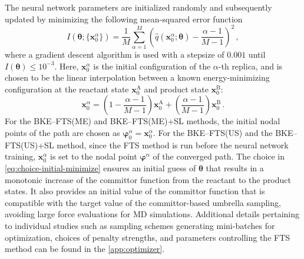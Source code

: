 \documentclass{article}
\numberwithin{equation}{section}
\def\*#1{\mathbf{#1}}
\theoremstyle{definition}
\theoremstyle{remark}
\def\thetab{\boldsymbol{\theta}}
\def\varphib{\boldsymbol{\varphi}}
\begin{document}
The neural network parameters are initialized randomly and subsequently updated by minimizing the following mean-squared error function
\begin{equation}
    I(\thetab; \{ \* x_0^\alpha \} ) = \frac{1}{M} \sum_{\alpha =1}^M \left(\hat{q}(\* x_0^\alpha; \thetab)-\frac{\alpha-1}{M-1} \right)^2 \,, \label{eq:choice-initial-minimize}
\end{equation}
where a gradient descent algorithm is used with a stepsize of $ 0.001 $ until $ I (\thetab) \leq 10^{-3} $. Here, $\* x_0^\alpha$ is the initial configuration of the $\alpha$-th replica, and  
is chosen to be the linear interpolation between a known energy-minimizing configuration at the reactant state $\* x_{0}^\mathrm{A}$ and product state $\* x_{0}^\mathrm{B} $:
\begin{equation}
    \* x_0^\alpha = \left( 1 - \frac{\alpha-1}{M-1}\right) \* x_{0}^{\mathrm{A}} + \left(\frac{\alpha-1}{M-1}\right)\* x_{0}^{\mathrm{B}}\,.
\end{equation}
For the BKE--FTS(ME) and BKE--FTS(ME)+SL methods, the initial nodal points of the path are chosen as $\varphib_0^\alpha = \* x_0^\alpha$. For the BKE--FTS(US) and the BKE--FTS(US)+SL method, since the FTS method is run before the neural network training, $\* x_0^\alpha$ is set to the nodal point $\varphib^\alpha$ of the converged path.
The choice in \cref{eq:choice-initial-minimize} ensures an initial guess of $\thetab$ that results in a monotonic increase of the committor function from the reactant to the product states. It also provides an initial value of the committor function that is compatible with the target value of the committor-based umbrella sampling, avoiding large force evaluations for MD simulations. 
Additional details pertaining to individual studies such as sampling schemes generating mini-batches for optimization, choices of penalty strengths, and parameters controlling the FTS method can be found in the \cref{app:optimizer}.
\end{document}
